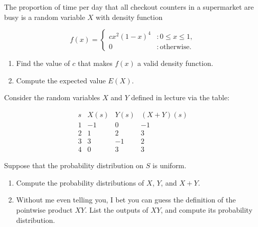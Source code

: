 \documentclass[12pt,reqno]{amsart}
\begin{document}
\bigskip
\prob The proportion of time per day that all checkout counters in a supermarket are busy is a random variable $X$ with density function

    \[f(x) = \begin{cases}
        cx^2(1-x)^4 & : 0 \leq x \leq 1, \\
        0 & : \text{otherwise}.
    \end{cases}\]

\medskip
\begin{enumerate}
    \item Find the value of $c$ that makes $f(x)$ a valid density function.\vfill
    
    

    \item Compute the expected value $E(X)$.\vfill
    

\end{enumerate}















\newpage
\prob Consider the random variables $X$ and $Y$ defined in lecture via the table:

    \[
    \begin{array}{c|ccc}
    s & X(s) & Y(s) & (X+Y)(s) \\ \hline
    1 & -1 & 0 & -1 \\
    2 & 1 & 2 & 3 \\
    3 & 3 & -1 & 2 \\
    4 & 0 & 3 & 3
    \end{array}
    \]

Suppose that the probability distribution on $S$ is uniform.

\medskip
\begin{enumerate}
    \item Compute the probability distributions of $X$, $Y$, and $X+Y$.\vfill

    

    \item Without me even telling you, I bet you can guess the definition of the pointwise product $XY$. List the outputs of $XY$, and compute its probability distribution.\vfill
    
    
\end{enumerate}
    
\end{document}
